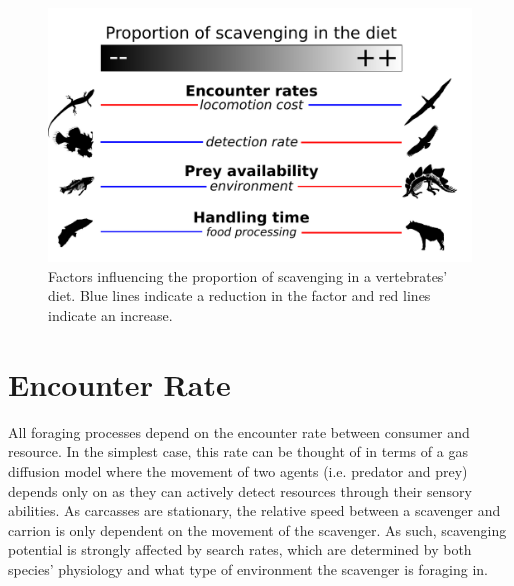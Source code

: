 \documentclass[a4paper,12pt]{article}
\begin{document}
\begin{figure}[!htbp]
\centering
   \includegraphics[width=1\textwidth]{Summary_figure/Summary_figure_Landscape.pdf}
\caption{Factors influencing the proportion of scavenging in a vertebrates' diet. Blue lines indicate a reduction in the factor and red lines indicate an increase.}
\label{Summary_figure}
\end{figure}


\section*{Encounter Rate}
All foraging processes depend on the encounter rate between consumer and resource. 
In the simplest case, this rate can be thought of in terms of a gas diffusion model where the movement of two agents (i.e. predator and prey) depends only on as they can actively detect resources through their sensory abilities. %
As carcasses are stationary, the relative speed between a scavenger and carrion is only dependent on the movement of the scavenger.
As such, scavenging potential is strongly affected by search rates, which are determined by both species' physiology and what type of environment the scavenger is foraging in.
\end{document}
